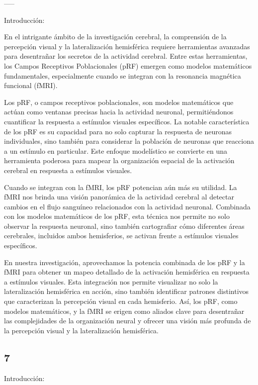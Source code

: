 \documentclass[12pt,oneside]{uhthesis}
\begin{document}
-----

Introducción:

En el intrigante ámbito de la investigación cerebral, la comprensión de la percepción visual y la lateralización hemisférica requiere herramientas avanzadas para desentrañar los secretos de la actividad cerebral. Entre estas herramientas, los Campos Receptivos Poblacionales (pRF) emergen como modelos matemáticos fundamentales, especialmente cuando se integran con la resonancia magnética funcional (fMRI).

Los pRF, o campos receptivos poblacionales, son modelos matemáticos que actúan como ventanas precisas hacia la actividad neuronal, permitiéndonos cuantificar la respuesta a estímulos visuales específicos. La notable característica de los pRF es su capacidad para no solo capturar la respuesta de neuronas individuales, sino también para considerar la población de neuronas que reacciona a un estímulo en particular. Este enfoque modelístico se convierte en una herramienta poderosa para mapear la organización espacial de la activación cerebral en respuesta a estímulos visuales.

Cuando se integran con la fMRI, los pRF potencian aún más su utilidad. La fMRI nos brinda una visión panorámica de la actividad cerebral al detectar cambios en el flujo sanguíneo relacionados con la actividad neuronal. Combinada con los modelos matemáticos de los pRF, esta técnica nos permite no solo observar la respuesta neuronal, sino también cartografiar cómo diferentes áreas cerebrales, incluidos ambos hemisferios, se activan frente a estímulos visuales específicos.

En nuestra investigación, aprovechamos la potencia combinada de los pRF y la fMRI para obtener un mapeo detallado de la activación hemisférica en respuesta a estímulos visuales. Esta integración nos permite visualizar no solo la lateralización hemisférica en acción, sino también identificar patrones distintivos que caracterizan la percepción visual en cada hemisferio. Así, los pRF, como modelos matemáticos, y la fMRI se erigen como aliados clave para desentrañar las complejidades de la organización neural y ofrecer una visión más profunda de la percepción visual y la lateralización hemisférica.

\subsection{7}

Introducción:
\end{document}
